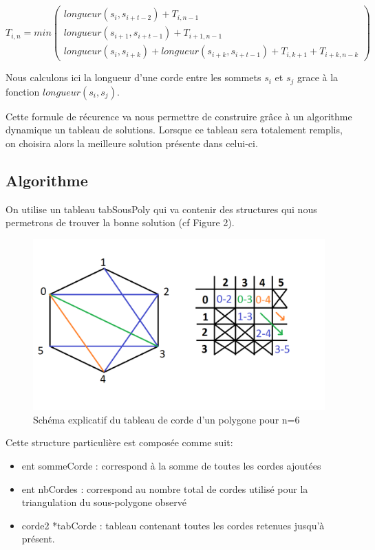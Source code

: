 \documentclass[a4paper,10pt]{article}
\begin{document}
\begin{equation} 
T_{i,n} = min 
\begin{pmatrix} 
 longueur(s_i, s_{i+t-2}) + T_{i,n-1} \\
  longueur(s_{i+1}, s_{i+t-1}) + T_{i+1,n-1} \\
  longueur(s_i, s_{i+k}) + longueur(s_{i+k}, s_{i+t-1}) + T_{i,k+1} + T_{i+k,n-k}
\end{pmatrix}               
\end{equation}

Nous calculons ici la longueur d'une corde entre les sommets \(s_i\) et \(s_j\) grace à la fonction \( longueur(s_i, s_j) \). 

Cette formule de récurence va nous permettre de construire grâce à un algorithme dynamique un tableau de solutions.
Lorsque ce tableau sera totalement remplis, on choisira alors la meilleure solution présente dans celui-ci.

\subsection{Algorithme}

On utilise un tableau tabSousPoly qui va contenir des structures qui nous permetrons de trouver la bonne solution (cf Figure 2).

\begin{figure}[h!]
\begin{center}
\includegraphics[scale=0.3]{schema1.png}
\caption{Schéma explicatif du tableau de corde d'un polygone pour n=6}
\end{center}
\end{figure}

Cette structure particulière est composée comme suit:
\begin{itemize}
\item ent sommeCorde : correspond à la somme de toutes les cordes ajoutées
 \item ent nbCordes : correspond au nombre total de cordes utilisé pour la triangulation du sous-polygone observé
 \item corde2 *tabCorde : tableau contenant toutes les cordes retenues jusqu'à présent.
\end{itemize}
\end{document}
